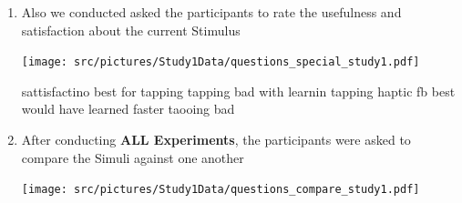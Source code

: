 \begin{enumerate}
    \item Also we conducted asked the participants to rate the usefulness and satisfaction about the current Stimulus
    
        \centering
        \texttt{[image: src/pictures/Study1Data/questions\_special\_study1.pdf]}
 
\begin{table}[ht]
\caption{Results of the Kruskal-Wallis significance tests for the different self-assessment dimensions with a $\eta^2$ Effect Size.}
\label{table:individualQuestions_significance_firstStudy}
\end{table}
sattisfactino best for tapping
tapping bad with learnin
tapping haptic fb best
would have learned faster taooing bad

    \item After conducting \textbf{ALL Experiments}, the participants were asked to compare the Simuli against one another

        \texttt{[image: src/pictures/Study1Data/questions\_compare\_study1.pdf]}


\end{enumerate}
